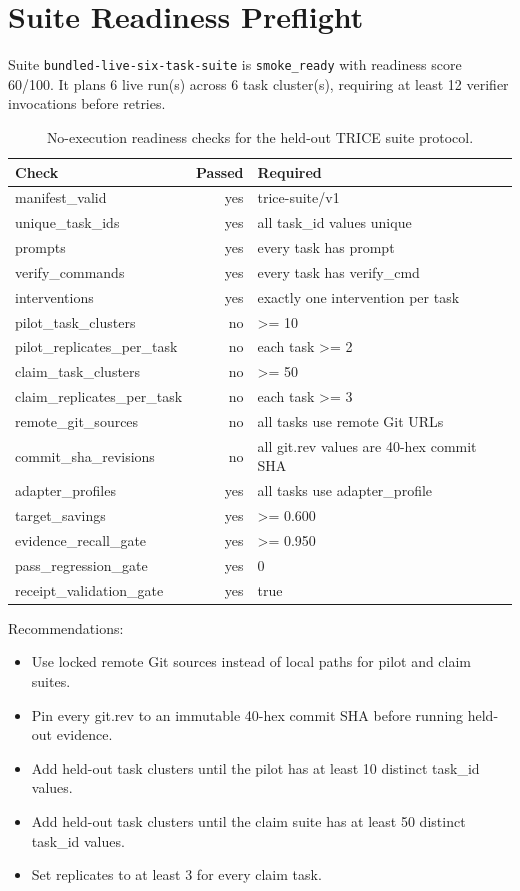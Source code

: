 \section{Suite Readiness Preflight}
Suite \texttt{bundled-live-six-task-suite} is \texttt{smoke\_ready} with readiness score 60/100. It plans 6 live run(s) across 6 task cluster(s), requiring at least 12 verifier invocations before retries.

\begin{table}[h]
\centering
\begin{tabular}{lrl}
\toprule
Check & Passed & Required \\
\midrule
manifest\_valid & yes & trice-suite/v1 \\
unique\_task\_ids & yes & all task\_id values unique \\
prompts & yes & every task has prompt \\
verify\_commands & yes & every task has verify\_cmd \\
interventions & yes & exactly one intervention per task \\
pilot\_task\_clusters & no & >= 10 \\
pilot\_replicates\_per\_task & no & each task >= 2 \\
claim\_task\_clusters & no & >= 50 \\
claim\_replicates\_per\_task & no & each task >= 3 \\
remote\_git\_sources & no & all tasks use remote Git URLs \\
commit\_sha\_revisions & no & all git.rev values are 40-hex commit SHA \\
adapter\_profiles & yes & all tasks use adapter\_profile \\
target\_savings & yes & >= 0.600 \\
evidence\_recall\_gate & yes & >= 0.950 \\
pass\_regression\_gate & yes & 0 \\
receipt\_validation\_gate & yes & true \\
\bottomrule
\end{tabular}
\caption{No-execution readiness checks for the held-out TRICE suite protocol.}
\end{table}

\noindent Recommendations:
\begin{itemize}
\item Use locked remote Git sources instead of local paths for pilot and claim suites.
\item Pin every git.rev to an immutable 40-hex commit SHA before running held-out evidence.
\item Add held-out task clusters until the pilot has at least 10 distinct task\_id values.
\item Add held-out task clusters until the claim suite has at least 50 distinct task\_id values.
\item Set replicates to at least 3 for every claim task.
\end{itemize}
